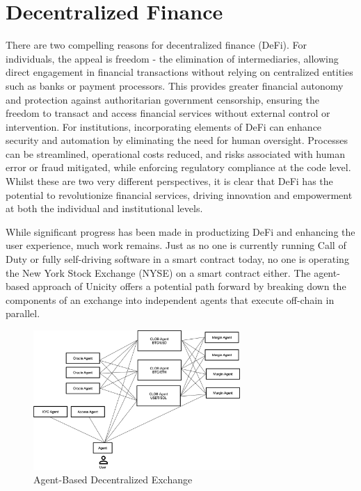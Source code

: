 \documentclass{article}
\begin{document}
\vspace{2mm}


\section{Decentralized Finance}
There are two compelling reasons for decentralized finance (DeFi). For individuals, the appeal is freedom - the elimination of intermediaries, allowing direct engagement in financial transactions without relying on centralized entities such as banks or payment processors. This provides greater financial autonomy and protection against authoritarian government censorship, ensuring the freedom to transact and access financial services without external control or intervention. For institutions, incorporating elements of DeFi can enhance security and automation by eliminating the need for human oversight. Processes can be streamlined, operational costs reduced, and risks associated with human error or fraud mitigated, while enforcing regulatory compliance at the code level. Whilst these are two very different perspectives, it is clear that DeFi has the potential to revolutionize financial services, driving innovation and empowerment at both the individual and institutional levels.

\vspace{2mm}

While significant progress has been made in productizing DeFi and enhancing the user experience, much work remains. Just as no one is currently running Call of Duty or fully self-driving software in a smart contract today, no one is operating the New York Stock Exchange (NYSE) on a smart contract either. The agent-based approach of Unicity offers a potential path forward by breaking down the components of an exchange into independent agents that execute off-chain in parallel. 

\begin{figure}[H]
    \centering
    \includegraphics[width=0.7\textwidth]{ABEX.png}
    \caption{Agent-Based Decentralized Exchange}
    \label{fig:ABEX}
\end{figure}
\end{document}
